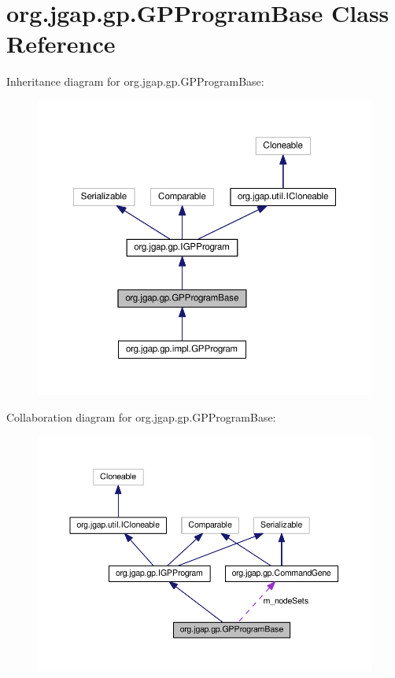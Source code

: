 \hypertarget{classorg_1_1jgap_1_1gp_1_1_g_p_program_base}{\section{org.\-jgap.\-gp.\-G\-P\-Program\-Base Class Reference}
\label{classorg_1_1jgap_1_1gp_1_1_g_p_program_base}
}


Inheritance diagram for org.\-jgap.\-gp.\-G\-P\-Program\-Base\-:
\nopagebreak
\begin{figure}[H]
\begin{center}
\leavevmode
\includegraphics[width=350pt]{classorg_1_1jgap_1_1gp_1_1_g_p_program_base__inherit__graph}
\end{center}
\end{figure}


Collaboration diagram for org.\-jgap.\-gp.\-G\-P\-Program\-Base\-:
\nopagebreak
\begin{figure}[H]
\begin{center}
\leavevmode
\includegraphics[width=350pt]{classorg_1_1jgap_1_1gp_1_1_g_p_program_base__coll__graph}
\end{center}
\end{figure}
